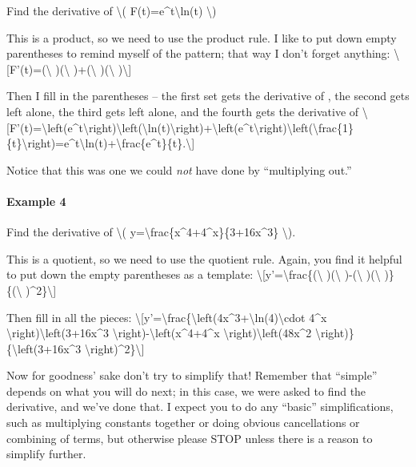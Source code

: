 Find the derivative of \textbackslash{}(
F(t)=e\^{}t\textbackslash{}ln(t) \textbackslash{})

This is a product, so we need to use the product rule. I like to put
down empty parentheses to remind myself of the pattern; that way I don't
forget anything: \textbackslash{}{[}F'(t)=(\textbackslash{}
)(\textbackslash{} )+(\textbackslash{} )(\textbackslash{}
)\textbackslash{}{]}

Then I fill in the parentheses -- the first set gets the derivative of ,
the second gets left alone, the third gets left alone, and the fourth
gets the derivative of
\textbackslash{}{[}F'(t)=\textbackslash{}left(e\^{}t\textbackslash{}right)\textbackslash{}left(\textbackslash{}ln(t)\textbackslash{}right)+\textbackslash{}left(e\^{}t\textbackslash{}right)\textbackslash{}left(\textbackslash{}frac\{1\}\{t\}\textbackslash{}right)=e\^{}t\textbackslash{}ln(t)+\textbackslash{}frac\{e\^{}t\}\{t\}.\textbackslash{}{]}

Notice that this was one we could \emph{not} have done by ``multiplying
out.''

\hypertarget{example-4}{%
\paragraph{Example 4}\label{example-4}}

Find the derivative of \textbackslash{}(
y=\textbackslash{}frac\{x\^{}4+4\^{}x\}\{3+16x\^{}3\} \textbackslash{}).

This is a quotient, so we need to use the quotient rule. Again, you find
it helpful to put down the empty parentheses as a template:
\textbackslash{}{[}y'=\textbackslash{}frac\{(\textbackslash{}
)(\textbackslash{} )-(\textbackslash{} )(\textbackslash{}
)\}\{(\textbackslash{} )\^{}2\}\textbackslash{}{]}

Then fill in all the pieces:
\textbackslash{}{[}y'=\textbackslash{}frac\{\textbackslash{}left(4x\^{}3+\textbackslash{}ln(4)\textbackslash{}cdot
4\^{}x \textbackslash{}right)\textbackslash{}left(3+16x\^{}3
\textbackslash{}right)-\textbackslash{}left(x\^{}4+4\^{}x
\textbackslash{}right)\textbackslash{}left(48x\^{}2
\textbackslash{}right)\}\{\textbackslash{}left(3+16x\^{}3
\textbackslash{}right)\^{}2\}\textbackslash{}{]}

Now for goodness' sake don't try to simplify that! Remember that
``simple'' depends on what you will do next; in this case, we were asked
to find the derivative, and we've done that. I expect you to do any
``basic'' simplifications, such as multiplying constants together or
doing obvious cancellations or combining of terms, but otherwise please
STOP unless there is a reason to simplify further.

